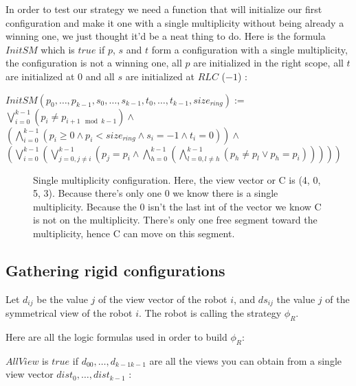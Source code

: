 \documentclass{article}
\begin{document}
In order to test our strategy we need a function that will initialize our first configuration and make it one with a single multiplicity without being already a winning one, we just thought it'd be a neat thing to do. Here is the formula $InitSM$ which is $true$ if $p$, $s$ and $t$ form a configuration with a single multiplicity, the configuration is not a winning one, all $p$ are initialized in the right scope, all $t$ are initialized at $0$ and all $s$ are initialized at $RLC$ ($-1$) :

\begin{center}
    
$InitSM(p_{0},\dots, p_{k-1}, s_{0}, \dots, s_{k-1}, t_{0}, \dots, t_{k-1}, size_{ring}):=$\\
$\bigvee_{i = 0}^{k-1}( p_{i} \not= p_{i+1 \mod{k-1}} ) \land$\\
$(\bigwedge_{i = 0}^{k-1} ( p_{i} \geq 0 \land p_{i} <  size_{ring} \land s_{i} = -1 \land t_{i} = 0)) \land$\\
$(\bigvee_{i = 0}^{k-1} (\bigvee_{j = 0, j\not=i}^{k-1} (p_{j} = p_{i} \land \bigwedge_{h = 0}^{k-1} ( \bigwedge_{l = 0, l\not=h}^{k-1} (p_{h} \not= p_{l} \lor p_{h} = p_{i}) ) ) ) )$
\end{center}

\begin{figure}[!hp]
    \centering
    \def\svgscale{0.3}
    
    \caption{Single multiplicity configuration. Here, the view vector or C is (4, 0, 5, 3). Because there's only one 0 we know there is a single multiplicity. Because the 0 isn't the last int of the vector we know C is not on the multiplicity. There's only one free segment toward the multiplicity, hence C can move on this segment.}
    \label{dessinSM}
\end{figure}

\subsection{Gathering rigid configurations}

Let $d_{ij}$ be the value $j$ of the view vector of the robot $i$, and $ds_{ij}$ the value $j$ of the symmetrical 
view of the robot $i$.
The robot is calling the strategy $\phi_R$.

Here are all the logic formulas used in order to build $\phi_R$:\newline


$AllView$ is $true$ if $d_{00}, \ldots ,d_{k-1k-1}$ are all the views you can obtain from a single view vector $dist_{0}, \ldots ,dist_{k-1}$ :
\end{document}
